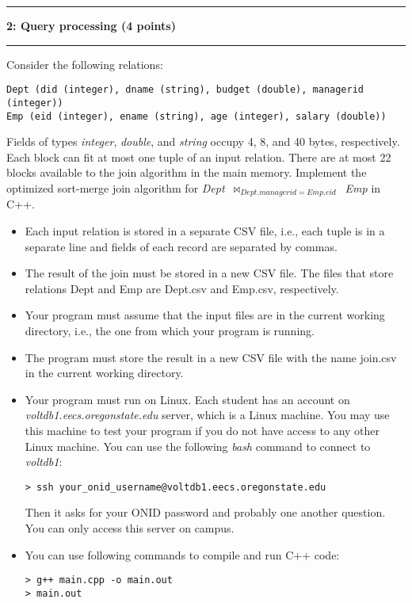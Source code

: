 \documentclass[11pt]{article}
\newcommand\question[2]{\vspace{.25in}\hrule\textbf{#1: #2}\vspace{.5em}\hrule\vspace{.10in}}
\begin{document}
\question{2}{Query processing  (4 points)}
Consider the following relations:
\begin{verbatim}
Dept (did (integer), dname (string), budget (double), managerid (integer))
Emp (eid (integer), ename (string), age (integer), salary (double))
\end{verbatim}

Fields of types \textit{integer}, \textit{double}, and \textit{string} occupy 4, 8, and 40 bytes, respectively. 
Each block can fit at most one tuple of an input relation. There are at most 22 blocks available to the join algorithm in the main memory.
Implement the optimized sort-merge join algorithm for \textit{Dept}~$\bowtie_{Dept.managerid=Emp.eid}$~\textit{Emp} in C++.
\begin{itemize}
\item Each input relation is stored in a separate CSV file, i.e., each tuple is in a separate line and fields of each record are separated by commas.
\item The result of the join must be stored in a new CSV file.
The files that store relations Dept and Emp are Dept.csv and Emp.csv, respectively. 
\item Your program must assume that the input files are in the current working directory, i.e., the one from which your program is running.
\item The program must store the result in a new CSV file with the name join.csv in the current working directory.
\item Your program must run on Linux. Each student has an account on 
\textit{voltdb1.eecs.oregonstate.edu} server, which is a Linux machine. You may use this machine to test your program if you do not have access to any other Linux machine. You can use the following \textit{bash} command to connect to \textit{voltdb1}:
\begin{verbatim}
> ssh your_onid_username@voltdb1.eecs.oregonstate.edu
\end{verbatim}
Then it asks for your ONID password and probably one another question. You can only access this server on campus.

\item You can use following commands to compile and run C++ code:

\begin{verbatim}
> g++ main.cpp -o main.out
> main.out
\end{verbatim}

\end{itemize}
\end{document}
